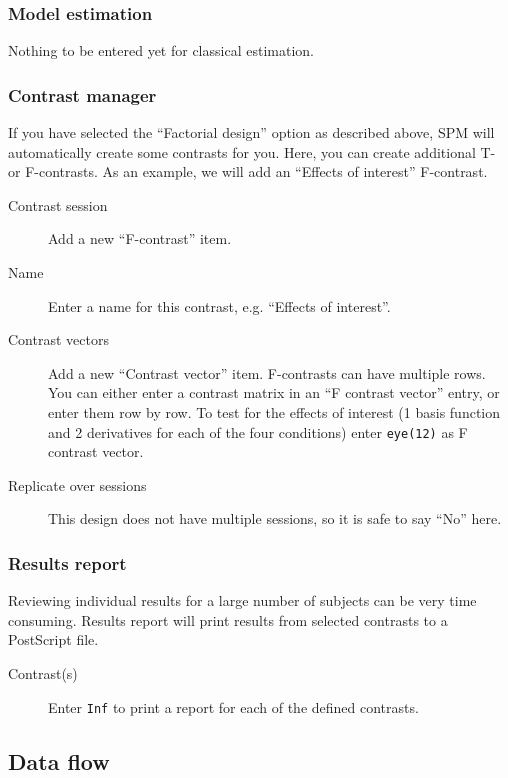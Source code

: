 \subsubsection*{Model estimation}

Nothing to be entered yet for classical estimation.

\subsubsection*{Contrast manager} 

If you have selected the ``Factorial design'' option as described above, SPM
will automatically create some contrasts for you. Here, you can create
additional T- or F-contrasts. As an example, we will add an ``Effects of
interest'' F-contrast. 

\begin{description}
\item[Contrast session] Add a new ``F-contrast'' item.
\item[Name] Enter a name for this contrast, e.g. ``Effects of interest''.
\item[Contrast vectors] Add a new ``Contrast vector'' item. F-contrasts
  can have multiple rows. You can either enter a contrast matrix in an ``F
  contrast vector'' entry, or enter them row by row. To test for the
  effects of interest (1 basis function and 2 derivatives for each of the
  four conditions) enter \verb|eye(12)| as F contrast vector.
\item[Replicate over sessions] This design does not have multiple
  sessions, so it is safe to say ``No'' here.
\end{description}

\subsubsection*{Results report}

Reviewing individual results for a large number of subjects can be very time
consuming. Results report will print results from selected contrasts to a
PostScript file. 
  
\begin{description}
\item[Contrast(s)] Enter \verb|Inf| to print a report for each of the
  defined contrasts.
\end{description}

\subsection{Data flow}

